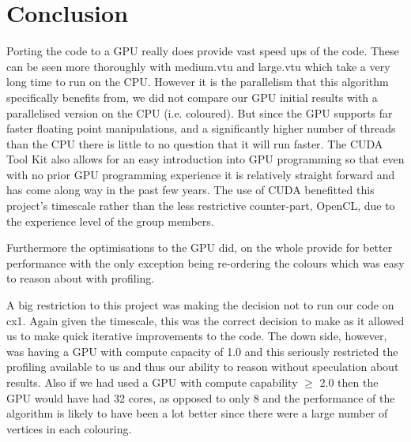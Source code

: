 \section{Conclusion}
Porting the code to a GPU really does provide vast speed ups of the code. These can be seen more thoroughly with medium.vtu and large.vtu which take a very long time to run on the CPU.
However it is the parallelism that this algorithm specifically benefits from, we did not compare our GPU initial results with a parallelised version on the CPU (i.e. coloured). But since the GPU supports far faster floating point manipulations, and a significantly higher number of threads than the CPU there is little to no question that it will run faster.
The CUDA Tool Kit also allows for an easy introduction into GPU programming so that even with no prior GPU programming experience it is relatively straight forward and has come along way in the past few years. The use of CUDA benefitted this project's timescale rather than the less restrictive counter-part, OpenCL, due to the experience level of the group members.

Furthermore the optimisations to the GPU did, on the whole provide for better performance with the only exception being re-ordering the colours which was easy to reason about with profiling.

A big restriction to this project was making the decision not to run our code on cx1. Again given the timescale, this was the correct decision to make as it allowed us to make quick iterative improvements to the code. The down side, however, was having a GPU with compute capacity of 1.0 and this seriously restricted the profiling available to us and thus our ability to reason without speculation about results.
Also if we had used a GPU with compute capability $\ge$ 2.0 then the GPU would have had 32 cores\cite{compute_2.0}, as opposed to only 8 and the performance of the algorithm is likely to have been a lot better since there were a large number of vertices in each colouring.

